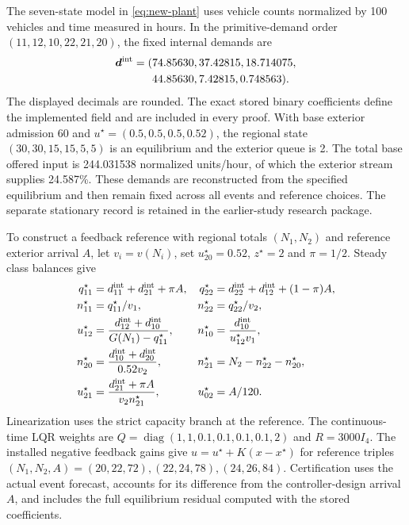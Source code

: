 \documentclass[preprint,12pt]{elsarticle}
\begin{document}
The seven-state model in \eqref{eq:new-plant} uses vehicle counts normalized
by 100 vehicles and time measured in hours. In the primitive-demand order
$(11,12,10,22,21,20)$, the fixed internal demands are
\begin{equation}
\begin{aligned}
\boldsymbol d^{\rm int}=(&74.85630,37.42815,18.714075,\\
              &44.85630,7.42815,0.748563).
\end{aligned}
\label{eq:new-incident-demands}
\end{equation}
The displayed decimals are rounded. The exact stored binary coefficients
define the implemented field and are included in every proof. With base
exterior admission 60 and $u^\star=(0.5,0.5,0.5,0.52)$, the regional
state $(30,30,15,15,5,5)$ is an equilibrium and the exterior queue is 2.
The total base offered input is 244.031538 normalized units/hour, of which
the exterior stream supplies 24.587\%. These demands are reconstructed from
the specified equilibrium and then remain fixed across all events and
reference choices. The separate stationary record is retained in the earlier-study research package.

To construct a feedback reference with regional totals $(N_1,N_2)$ and
reference exterior arrival $A$, let $v_i=v(N_i)$, set
$u_{20}^\star=0.52$, $z^\star=2$ and $\pi=1/2$. Steady class balances give
\begin{equation}
\begin{aligned}
q_{11}^\star&=d^{\rm int}_{11}+d^{\rm int}_{21}+\pi A,&
q_{22}^\star&=d^{\rm int}_{22}+d^{\rm int}_{12}+(1-\pi)A,\\
n_{11}^\star&=q_{11}^\star/v_1,&
n_{22}^\star&=q_{22}^\star/v_2,\\
u_{12}^\star&=\frac{d^{\rm int}_{12}+d^{\rm int}_{10}}{G(N_1)-q_{11}^\star},&
n_{10}^\star&=\frac{d^{\rm int}_{10}}{u_{12}^\star v_1},\\
n_{20}^\star&=\frac{d^{\rm int}_{10}+d^{\rm int}_{20}}{0.52v_2},&
n_{21}^\star&=N_2-n_{22}^\star-n_{20}^\star,\\
u_{21}^\star&=\frac{d^{\rm int}_{21}+\pi A}{v_2n_{21}^\star},&
u_{02}^\star&=A/120.
\end{aligned}
\label{eq:new-targets}
\end{equation}
Linearization uses the strict capacity branch at the reference. The
continuous-time LQR weights are
$Q=\operatorname{diag}(1,1,0.1,0.1,0.1,0.1,2)$ and $R=3000I_4$.
The installed negative feedback gains give
$u=u^\star+K(x-x^\star)$ for reference triples
$(N_1,N_2,A)=(20,22,72),(22,24,78),(24,26,84)$.
Certification uses the actual event forecast, accounts for its difference
from the controller-design arrival $A$, and includes the full equilibrium
residual computed with the stored coefficients.
\end{document}
